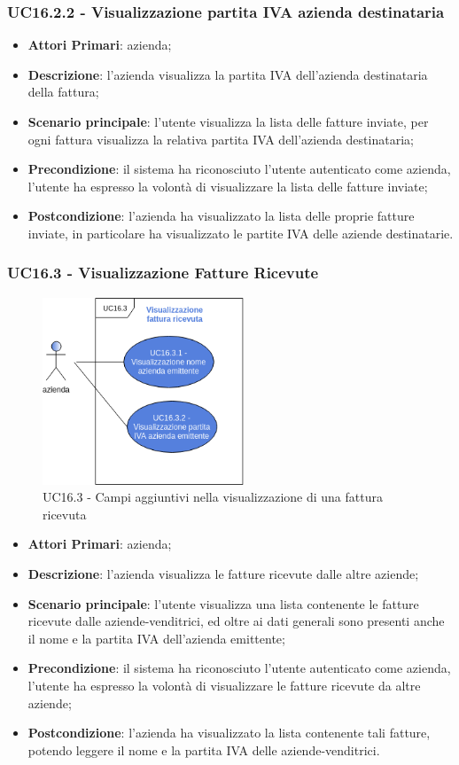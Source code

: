 \subsubsection{UC16.2.2 - Visualizzazione partita IVA azienda destinataria}
\begin{itemize}
	\item \textbf{Attori Primari}: azienda;
	\item \textbf{Descrizione}: l'azienda visualizza la partita IVA dell'azienda destinataria della fattura;
	\item \textbf{Scenario principale}: l'utente visualizza la lista delle fatture inviate, per ogni fattura visualizza la relativa partita IVA dell'azienda destinataria;
	\item \textbf{Precondizione}: il sistema ha riconosciuto l'utente autenticato come azienda, l'utente ha espresso la volontà di visualizzare la lista delle fatture inviate;
	\item \textbf{Postcondizione}: l'azienda ha visualizzato la lista delle proprie fatture inviate, in particolare ha visualizzato le partite IVA delle aziende destinatarie.
\end{itemize} 



\subsubsection{UC16.3 - Visualizzazione Fatture Ricevute}
\begin{figure}[h]
	\includegraphics[width=6cm]{res/images/UC16-VisualizzazioneFatturaRicevuta.png}
	\centering
	\caption{UC16.3 - Campi aggiuntivi nella visualizzazione di una fattura ricevuta}
\end{figure}

\begin{itemize}
	\item \textbf{Attori Primari}: azienda;
	\item \textbf{Descrizione}: l'azienda visualizza le fatture ricevute dalle altre aziende;
	\item \textbf{Scenario principale}: l'utente visualizza una lista contenente le fatture ricevute dalle aziende-venditrici, ed oltre ai dati generali sono presenti anche il nome e la partita IVA dell'azienda emittente;
	\item \textbf{Precondizione}: il sistema ha riconosciuto l'utente autenticato come azienda, l'utente ha espresso la volontà di visualizzare le fatture ricevute da altre aziende;
	\item \textbf{Postcondizione}: l'azienda ha visualizzato la lista contenente tali fatture, potendo leggere il nome e la partita IVA delle aziende-venditrici.
\end{itemize}

